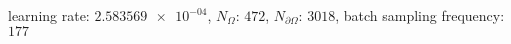 learning rate: $\num[scientific-notation=true]{2.583569e-04}$, $N_{\Omega}$: $\num[scientific-notation=false]{472}$, $N_{\partial\Omega}$: $\num[scientific-notation=false]{3018}$, batch sampling frequency: $\num[scientific-notation=false]{177}$